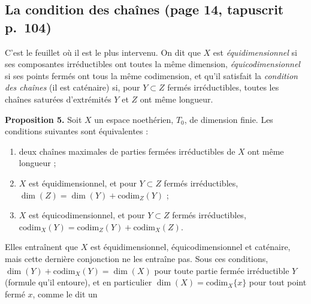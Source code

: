 \documentclass[11pt,a4paper]{article}
\begin{document}
\subsection*{La condition des chaînes (page 14, tapuscrit p.~104)}

C'est le feuillet où il est le plus intervenu. On dit que $X$ est
\emph{équidimensionnel} si ses composantes irréductibles ont toutes la même
dimension, \emph{équicodimensionnel} si ses points fermés ont tous la même
codimension, et qu'il satisfait la \emph{condition des chaînes} (il est
caténaire) si, pour $Y \subset Z$ fermés irréductibles, toutes les chaînes
saturées d'extrémités $Y$ et $Z$ ont même longueur.

\textbf{Proposition 5.} Soit $X$ un espace noethérien, $T_{0}$, de dimension
finie. Les conditions suivantes sont équivalentes :
\begin{enumerate}
\item[a)] deux chaînes maximales de parties fermées irréductibles de $X$ ont
même longueur ;
\item[c)] $X$ est équidimensionnel, et pour $Y \subset Z$ fermés
irréductibles, $\dim(Z) = \dim(Y) + \mathrm{codim}_{Z}(Y)$ ;
\item[d)] $X$ est équicodimensionnel, et pour $Y \subset Z$ fermés
irréductibles, $\mathrm{codim}_{X}(Y) = \mathrm{codim}_{Z}(Y) +
\mathrm{codim}_{X}(Z)$.
\end{enumerate}
Elles entraînent que $X$ est équidimensionnel, équicodimensionnel et
caténaire, mais cette dernière conjonction ne les entraîne pas. Sous ces
conditions, $\dim(Y) + \mathrm{codim}_{X}(Y) = \dim(X)$ pour toute partie
fermée irréductible $Y$ (formule qu'il entoure), et en particulier
$\dim(X) = \mathrm{codim}_{X}\{x\}$ pour tout point fermé $x$, comme le dit un
\end{document}
